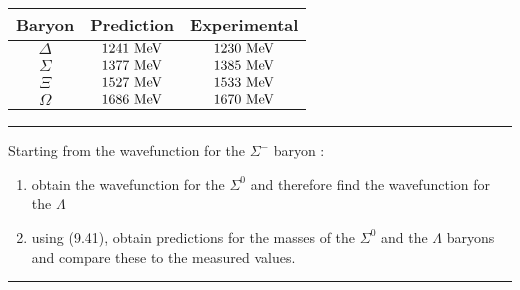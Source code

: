 \begin{table}[tbh!]
    \centering
    \begin{tabular}{c|cc}
    \hline
    Baryon   & Prediction  & Experimental \\ \hline
    $\Delta$ & $1241 \text{ MeV}$ & $1230 \text{ MeV}$  \\
    $\Sigma$ & $1377 \text{ MeV}$ & $1385 \text{ MeV}$  \\
    $\Xi$    & $1527 \text{ MeV}$ & $1533 \text{ MeV}$  \\
    $\Omega$ & $1686 \text{ MeV}$ & $1670 \text{ MeV}$ 
    \end{tabular}
\end{table} \vspace{0.1in}

\noindent\rule{7in}{1.5pt}


\begin{problem}{9.8}
Starting from the wavefunction for the $\Sigma^-$ baryon :

\begin{enumerate}[label=(\alph*)]
    \item obtain the wavefunction for the $\Sigma^0$ and therefore find the wavefunction for the $\Lambda$
    \item using (9.41), obtain predictions for the masses of the $\Sigma^0$ and the $\Lambda$ baryons and compare these to the measured values.
\end{enumerate}
\end{problem}
\begin{solution}

\end{solution}

\noindent\rule{7in}{1.5pt}


